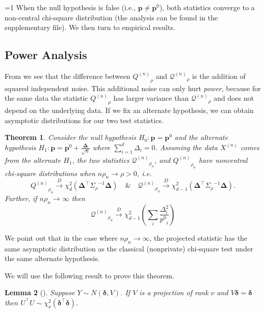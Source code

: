 \documentclass[twoside,letterpaper]{article} \usepackage{aistats2017}
\newtheorem{theorem}{Theorem}[section]
\newtheorem{lemma}[theorem]{Lemma}
\theoremstyle{definition}
\theoremstyle{remark}
\begin{document}
=1
When the null hypothesis is false (i.e., ${\mathbf{p}}\neq{{\mathbf{p}}^0}$), both statistics converge to a non-central chi-square distribution (the analysis can be found in the supplementary file).  We then turn to empirical results.
\else
\subsection{Power Analysis}
From  we see that the difference between ${Q^{({n})}}_{\rho}$ and ${\pmb{\mathcal{Q}}^{({n})}}_{\rho}$ is the addition of squared independent noise.  This additional noise can only hurt \emph{power}, because for the same data the statistic ${Q^{({n})}}_{\rho}$ has larger variance than ${\pmb{\mathcal{Q}}^{({n})}}_{\rho}$ and does not depend on the underlying data.  If we fix an alternate hypothesis, we can obtain asymptotic distributions for our two test statistics.
\begin{theorem}
Consider the null hypothesis $H_0: {\mathbf{p}} = {{\mathbf{p}}^0}$ and the alternate hypothesis $H_1:{\mathbf{p}} = {{\mathbf{p}}^0} + \frac{\pmb{\Delta}}{\sqrt{n}}$ where $\sum_{i=1}^d\Delta_i = 0$.  Assuming the data ${X^{({n})}}$ comes from the alternate $H_1$, the two statistics ${\pmb{\mathcal{Q}}^{({n})}}_{\rho_n}$, and ${Q^{({n})}}_{\rho_n}$ have noncentral chi-square distributions when $n \rho_n  \to \rho > 0$, i.e. 
$$
{Q^{({n})}}_{\rho_n}\stackrel{D}{\to} \chi_{d}^2\left(\pmb{\Delta}^\intercal {{\Sigma}_{{\rho}}}^{-1}\pmb{\Delta}\right) \quad \& \quad 
{\pmb{\mathcal{Q}}^{({n})}}_{\rho_n}\stackrel{D}{\to} \chi_{d-1}^2\left(\pmb{\Delta}^\intercal {{\Sigma}_{{\rho}}}^{-1}\pmb{\Delta}\right) .
$$
Further, if $n \rho_n \to \infty$ then 
$$
{\pmb{\mathcal{Q}}^{({n})}}_{\rho_n}\stackrel{D}{\to} \chi_{d-1}^2\left(\sum_i \frac{\Delta_i^2}{{p^0}_i} \right)
$$
\label{thm:power}
\end{theorem}

We point out that in the case where $n \rho_n \to \infty$, the projected statistic has the same asymptotic distribution as the classical (nonprivate) chi-square test under the same alternate hypothesis.  

We will use the following result to prove this theorem.
\begin{lemma}[\cite{Ferg96}]
Suppose $Y  \sim N(\pmb{\delta}, V)$.  If $V$ is a projection of rank $\nu$ and $V \pmb{\delta} = \pmb{\delta}$ then $U^\intercal U \sim \chi^2_\nu(\pmb{\delta}^\intercal\pmb{\delta})$.  
\label{lem:Ferg_noncentral}
\end{lemma}
\end{document}
